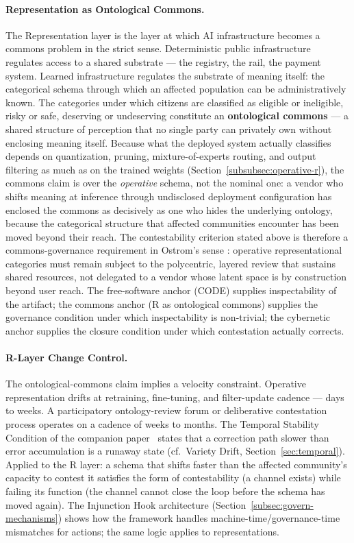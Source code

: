 \documentclass{article}
\theoremstyle{definition}
\begin{document}
\paragraph{Representation as Ontological Commons.} The Representation layer is the layer at which AI infrastructure becomes a commons problem in the strict sense. Deterministic public infrastructure regulates access to a shared substrate --- the registry, the rail, the payment system. Learned infrastructure regulates the substrate of meaning itself: the categorical schema through which an affected population can be administratively known. The categories under which citizens are classified as eligible or ineligible, risky or safe, deserving or undeserving constitute an \textbf{ontological commons} --- a shared structure of perception that no single party can privately own without enclosing meaning itself. Because what the deployed system actually classifies depends on quantization, pruning, mixture-of-experts routing, and output filtering as much as on the trained weights (Section~\ref{subsubsec:operative-r}), the commons claim is over the \emph{operative} schema, not the nominal one: a vendor who shifts meaning at inference through undisclosed deployment configuration has enclosed the commons as decisively as one who hides the underlying ontology, because the categorical structure that affected communities encounter has been moved beyond their reach. The contestability criterion stated above is therefore a commons-governance requirement in Ostrom's sense \citep{ostrom1990}: operative representational categories must remain subject to the polycentric, layered review that sustains shared resources, not delegated to a vendor whose latent space is by construction beyond user reach. The free-software anchor (CODE) supplies inspectability of the artifact; the commons anchor (R as ontological commons) supplies the governance condition under which inspectability is non-trivial; the cybernetic anchor supplies the closure condition under which contestation actually corrects.

\paragraph{R-Layer Change Control.} The ontological-commons claim implies a velocity constraint. Operative representation drifts at retraining, fine-tuning, and filter-update cadence --- days to weeks. A participatory ontology-review forum or deliberative contestation process operates on a cadence of weeks to months. The Temporal Stability Condition of the companion paper~\citep{aravind2026dpi} states that a correction path slower than error accumulation is a runaway state (cf.\ Variety Drift, Section~\ref{sec:temporal}). Applied to the R layer: a schema that shifts faster than the affected community's capacity to contest it satisfies the form of contestability (a channel exists) while failing its function (the channel cannot close the loop before the schema has moved again). The Injunction Hook architecture (Section~\ref{subsec:govern-mechanisms}) shows how the framework handles machine-time/governance-time mismatches for actions; the same logic applies to representations.
\end{document}
